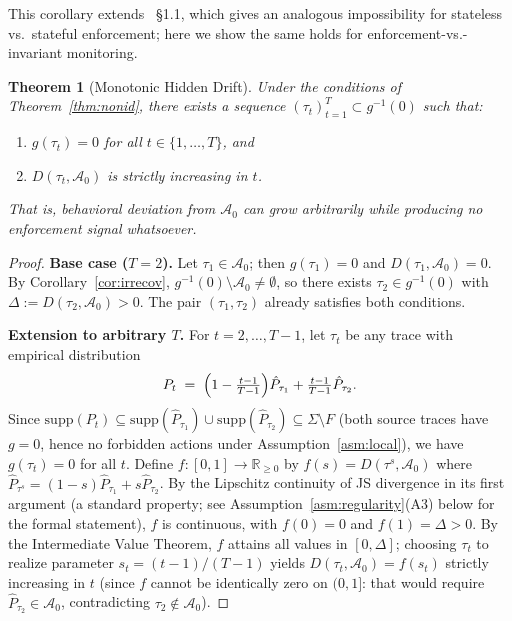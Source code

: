 \documentclass[11pt]{article}
\newtheorem{theorem}{Theorem}[section]
\newcommand{\Azero}{\mathcal{A}_0}
\begin{document}
\noindent
This corollary extends \citet{fernandez2026acp}~\S1.1, which gives an
analogous impossibility for stateless vs.\ stateful enforcement; here we show
the same holds for enforcement-vs.-invariant monitoring.

\begin{theorem}[Monotonic Hidden Drift]
\label{thm:hiddendrift}
Under the conditions of Theorem~\ref{thm:nonid}, there exists a sequence
$(\tau_t)_{t=1}^{T} \subset g^{-1}(0)$ such that:
\begin{enumerate}[nosep, leftmargin=1.5em]
  \item $g(\tau_t) = 0$ for all $t \in \{1,\ldots,T\}$, and
  \item $D(\tau_t, \Azero)$ is strictly increasing in $t$.
\end{enumerate}
That is, behavioral deviation from $\Azero$ can grow arbitrarily while
producing no enforcement signal whatsoever.
\end{theorem}

\begin{proof}
\textbf{Base case ($T=2$).}
Let $\tau_1 \in \Azero$; then $g(\tau_1)=0$ and $D(\tau_1,\Azero)=0$.
By Corollary~\ref{cor:irrecov}, $g^{-1}(0)\setminus\Azero \neq \emptyset$,
so there exists $\tau_2 \in g^{-1}(0)$ with $\Delta := D(\tau_2,\Azero)>0$.
The pair $(\tau_1,\tau_2)$ already satisfies both conditions.

\textbf{Extension to arbitrary $T$.}
For $t = 2,\ldots,T-1$, let $\tau_t$ be any trace with empirical distribution
\[
  P_t \;=\; \Bigl(1-\tfrac{t-1}{T-1}\Bigr)\hat{P}_{\tau_1}
            + \tfrac{t-1}{T-1}\hat{P}_{\tau_2}.
\]
Since $\mathrm{supp}(P_t) \subseteq \mathrm{supp}(\hat{P}_{\tau_1}) \cup
\mathrm{supp}(\hat{P}_{\tau_2}) \subseteq \Sigma\setminus F$
(both source traces have $g=0$, hence no forbidden actions under
Assumption~\ref{asm:local}), we have $g(\tau_t)=0$ for all $t$.
Define $f:[0,1]\to\mathbb{R}_{\geq 0}$ by $f(s) = D(\tau^s,\Azero)$
where $\hat{P}_{\tau^s} = (1-s)\hat{P}_{\tau_1} + s\hat{P}_{\tau_2}$.
By the Lipschitz continuity of JS divergence in its first argument
(a standard property; see Assumption~\ref{asm:regularity}(A3) below for
the formal statement), $f$ is continuous, with $f(0)=0$ and
$f(1)=\Delta>0$.  By the Intermediate Value Theorem, $f$ attains all
values in $[0,\Delta]$; choosing $\tau_t$ to realize parameter
$s_t=(t-1)/(T-1)$ yields $D(\tau_t,\Azero)=f(s_t)$ strictly
increasing in $t$ (since $f$ cannot be identically zero on $(0,1]$:
that would require $\hat{P}_{\tau_2}\in\Azero$, contradicting
$\tau_2\notin\Azero$).
\end{proof}
\end{document}
